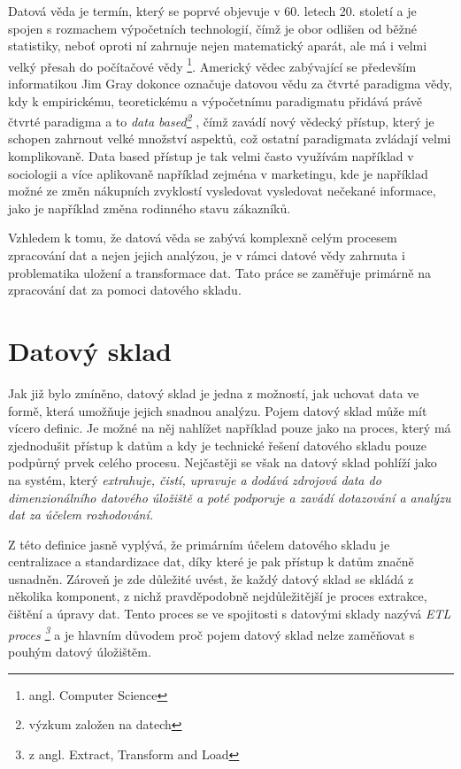 \documentclass[
  digital,     %
  twoside,     %
  lof,         %
  lot,         %
]{fithesis4}
\begin{document}
 Datová věda je termín, který se poprvé objevuje v 60. letech 20. století a je spojen s rozmachem výpočetních technologií, čímž je obor odlišen od běžné statistiky, neboť  oproti ní zahrnuje nejen matematický aparát, ale má i velmi velký přesah do počítačové vědy \footnote{angl. Computer Science
 }.   \parencite{Foote2021} Americký vědec zabývající se především informatikou Jim Gray dokonce označuje datovou vědu za čtvrté paradigma vědy, kdy k empirickému, teoretickému a výpočetnímu paradigmatu přidává právě čtvrté paradigma a to \emph{data based\footnote{výzkum založen na datech}} \parencite{hey2009fourth}, čímž zavádí nový vědecký přístup, který je schopen zahrnout velké množství aspektů, což ostatní paradigmata zvládají velmi komplikovaně. Data based přístup je tak velmi často využívám například v sociologii a více aplikovaně například zejména v marketingu, kde je například možné ze změn nákupních zvyklostí vysledovat vysledovat nečekané informace, jako je například změna rodinného stavu zákazníků.\parencite{Zeleny2015}
 
Vzhledem k tomu, že datová věda se zabývá komplexně celým procesem zpracování dat a nejen jejich analýzou, je v rámci datové vědy zahrnuta i problematika uložení a transformace dat. Tato práce se zaměřuje primárně na zpracování dat za pomoci datového skladu. 

\chapter {Datový sklad}
Jak již bylo zmíněno, datový sklad je jedna z možností, jak uchovat data ve formě, která umožňuje jejich snadnou analýzu. Pojem datový sklad může mít vícero definic. Je možné na něj nahlížet například pouze jako na proces, který má zjednodušit přístup k datům a kdy je technické řešení datového skladu pouze podpůrný prvek celého procesu. Nejčastěji se však na datový sklad pohlíží jako na systém, který \emph{extrahuje, čistí, upravuje a dodává zdrojová data do dimenzionálního datového úložiště a poté podporuje a zavádí dotazování a analýzu dat za účelem rozhodování.} \parencite[s.~23]{Kimballc2004}

Z této definice jasně vyplývá, že primárním účelem datového skladu je centralizace a standardizace dat, díky které je pak přístup k datům značně usnadněn. Zároveň je zde důležité uvést, že každý datový sklad se skládá z několika komponent, z nichž pravděpodobně nejdůležitější je proces extrakce, čištění a úpravy dat. Tento proces se ve spojitosti s datovými sklady nazývá \emph{ETL proces \footnote{z angl. Extract, Transform and Load} }a je hlavním důvodem proč pojem datový sklad nelze zaměňovat s pouhým datový úložištěm. \parencite[s.~24]{Kimballc2004}
\end{document}
